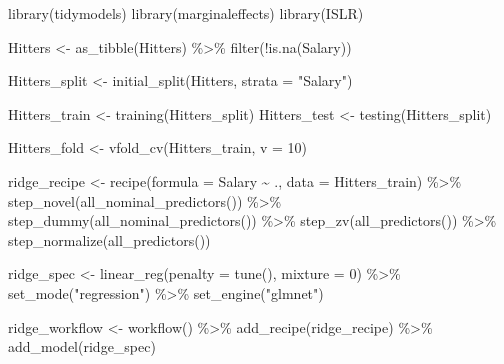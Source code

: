 \documentclass[
  letterpaper,
  DIV=11,
  numbers=noendperiod]{scrreprt}
\newenvironment{Shaded}{\begin{snugshade}}{\end{snugshade}}
\newcommand{\AttributeTok}[1]{\textcolor[rgb]{0.40,0.45,0.13}{#1}}
\newcommand{\DecValTok}[1]{\textcolor[rgb]{0.68,0.00,0.00}{#1}}
\newcommand{\FunctionTok}[1]{\textcolor[rgb]{0.28,0.35,0.67}{#1}}
\newcommand{\NormalTok}[1]{\textcolor[rgb]{0.00,0.23,0.31}{#1}}
\newcommand{\OtherTok}[1]{\textcolor[rgb]{0.00,0.23,0.31}{#1}}
\newcommand{\SpecialCharTok}[1]{\textcolor[rgb]{0.37,0.37,0.37}{#1}}
\newcommand{\StringTok}[1]{\textcolor[rgb]{0.13,0.47,0.30}{#1}}
\begin{document}
\begin{Shaded}
\begin{Highlighting}[]
\FunctionTok{library}\NormalTok{(tidymodels)}
\FunctionTok{library}\NormalTok{(marginaleffects)}
\FunctionTok{library}\NormalTok{(ISLR)}

\NormalTok{Hitters }\OtherTok{\textless{}{-}} \FunctionTok{as\_tibble}\NormalTok{(Hitters) }\SpecialCharTok{\%\textgreater{}\%}
  \FunctionTok{filter}\NormalTok{(}\SpecialCharTok{!}\FunctionTok{is.na}\NormalTok{(Salary))}

\NormalTok{Hitters\_split }\OtherTok{\textless{}{-}} \FunctionTok{initial\_split}\NormalTok{(Hitters, }\AttributeTok{strata =} \StringTok{"Salary"}\NormalTok{)}

\NormalTok{Hitters\_train }\OtherTok{\textless{}{-}} \FunctionTok{training}\NormalTok{(Hitters\_split)}
\NormalTok{Hitters\_test }\OtherTok{\textless{}{-}} \FunctionTok{testing}\NormalTok{(Hitters\_split)}

\NormalTok{Hitters\_fold }\OtherTok{\textless{}{-}} \FunctionTok{vfold\_cv}\NormalTok{(Hitters\_train, }\AttributeTok{v =} \DecValTok{10}\NormalTok{)}


\NormalTok{ridge\_recipe }\OtherTok{\textless{}{-}} 
  \FunctionTok{recipe}\NormalTok{(}\AttributeTok{formula =}\NormalTok{ Salary }\SpecialCharTok{\textasciitilde{}}\NormalTok{ ., }\AttributeTok{data =}\NormalTok{ Hitters\_train) }\SpecialCharTok{\%\textgreater{}\%} 
  \FunctionTok{step\_novel}\NormalTok{(}\FunctionTok{all\_nominal\_predictors}\NormalTok{()) }\SpecialCharTok{\%\textgreater{}\%} 
  \FunctionTok{step\_dummy}\NormalTok{(}\FunctionTok{all\_nominal\_predictors}\NormalTok{()) }\SpecialCharTok{\%\textgreater{}\%} 
  \FunctionTok{step\_zv}\NormalTok{(}\FunctionTok{all\_predictors}\NormalTok{()) }\SpecialCharTok{\%\textgreater{}\%} 
  \FunctionTok{step\_normalize}\NormalTok{(}\FunctionTok{all\_predictors}\NormalTok{())}

\NormalTok{ridge\_spec }\OtherTok{\textless{}{-}} 
  \FunctionTok{linear\_reg}\NormalTok{(}\AttributeTok{penalty =} \FunctionTok{tune}\NormalTok{(), }\AttributeTok{mixture =} \DecValTok{0}\NormalTok{) }\SpecialCharTok{\%\textgreater{}\%} 
  \FunctionTok{set\_mode}\NormalTok{(}\StringTok{"regression"}\NormalTok{) }\SpecialCharTok{\%\textgreater{}\%} 
  \FunctionTok{set\_engine}\NormalTok{(}\StringTok{"glmnet"}\NormalTok{)}

\NormalTok{ridge\_workflow }\OtherTok{\textless{}{-}} \FunctionTok{workflow}\NormalTok{() }\SpecialCharTok{\%\textgreater{}\%} 
  \FunctionTok{add\_recipe}\NormalTok{(ridge\_recipe) }\SpecialCharTok{\%\textgreater{}\%} 
  \FunctionTok{add\_model}\NormalTok{(ridge\_spec)}


\end{Highlighting}
\end{Shaded}
\end{document}
